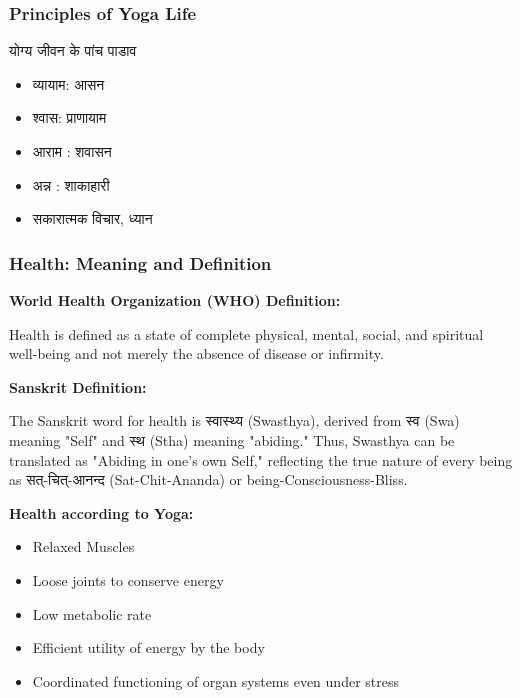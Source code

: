 \begin{frame}[fragile]\frametitle{Principles of Yoga Life}
योग्य जीवन के पांच पाडाव 
      \begin{itemize}
		\item  व्यायाम: आसन 
		\item  श्वास: प्राणायाम 
		\item  आराम : शवासन 
		\item  अन्न : शाकाहारी 
		\item  सकारात्मक विचार, ध्यान 
	  \end{itemize}

\end{frame}
\begin{frame}[fragile]\frametitle{Health: Meaning and Definition}
    \textbf{World Health Organization (WHO) Definition:}
    
        Health is defined as a state of complete physical, mental, social, and spiritual well-being and not merely the absence of disease or infirmity.
    

    
    \textbf{Sanskrit Definition:} 
    
        The Sanskrit word for health is स्वास्थ्य (Swasthya), derived from स्व (Swa) meaning "Self" and स्थ (Stha) meaning "abiding." Thus, Swasthya can be translated as "Abiding in one's own Self," reflecting the true nature of every being as सत्-चित्-आनन्द (Sat-Chit-Ananda) or being-Consciousness-Bliss.
    

    
    \textbf{Health according to Yoga:}
    \begin{itemize}
        \item Relaxed Muscles
        \item Loose joints to conserve energy
        \item Low metabolic rate
        \item Efficient utility of energy by the body
        \item Coordinated functioning of organ systems even under stress
    \end{itemize}
\end{frame}

